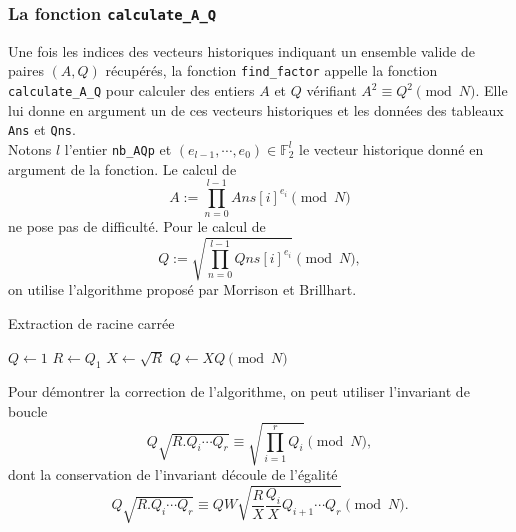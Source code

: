 \vspace{1em}

\subsubsection{La fonction \texttt{calculate\_A\_Q}}

Une fois les indices des vecteurs historiques indiquant un ensemble valide de
paires $(A, Q)$ récupérés, la fonction \texttt{find\_factor} appelle la
fonction \texttt{calculate\_A\_Q} pour calculer des entiers $A$ et $Q$
vérifiant $A^2 \equiv Q^2 \pmod{N}$. Elle lui donne en argument un de ces
vecteurs historiques et les données des tableaux \texttt{Ans} et \texttt{Qns}.
\\

Notons $l$ l'entier \texttt{nb\_AQp} et $(e_{l-1}, \cdots , e_0) \in
\mathbb{F}_2^{l}$ le vecteur historique donné en argument de la fonction. Le
calcul de \[A:= \prod_{n=0}^{l-1} Ans[i]^{e_i} \pmod{N} \] ne pose pas de
difficulté. Pour le calcul de \[Q:= \sqrt{\prod_{n=0}^{l-1 } Qns[i] ^{e_i}}
\pmod{N},\] on utilise l'algorithme proposé par Morrison et Brillhart.

\vspace{1em}
\begin{algorithm}[H]
\DontPrintSemicolon
\caption{\sc Extraction de racine carrée}
$Q \gets 1$\;
$R \gets Q_1$\;
$X \gets \sqrt{R}$\;
    $Q \gets XQ \pmod{N}$\;
\;
\end{algorithm}
\vspace{1em}

Pour démontrer la correction de l'algorithme, on peut utiliser l'invariant de
boucle \[Q\sqrt{R.Q_i\cdots Q_r} \equiv \sqrt{\prod_{i=1}^r Q_{i}} \pmod{N},\]
dont la conservation de l'invariant découle de l'égalité \[Q\sqrt{R.Q_i\cdots
Q_r} \equiv QW \sqrt{\frac{R}{X}\frac{Q_i}{X}Q_{i+1} \cdots Q_r} \pmod{N}.\]
